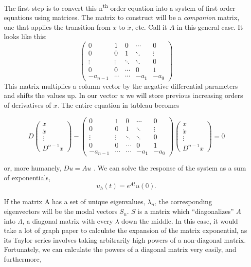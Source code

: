 \documentclass[a4paper,10pt]{report}
\numberwithin{equation}{section}
\begin{document}
The first step is to convert this n\textsuperscript{th}-order equation into a system of first-order equations using matrices. The matrix to construct will be a \emph{companion} matrix, one that applies the transition from $x$ to $\dot{x}$, etc. Call it $A$ in this general case. It looks like this:
\begin{equation}\label{companion}
\begin{pmatrix}
0 &1 &0 &\cdots &0\\
0 &0 &1 &\ddots &\vdots\\
\vdots &\vdots &\ddots &\ddots &0\\
0 &0 &\cdots &0 &1\\
-a_{n-1} &\cdots &\cdots &-a_1 &-a_0
\end{pmatrix}
\end{equation}
This matrix multiplies a column vector by the negative differential parameters and shifts the values up. In our vector $u$ we will store previous increasing orders of derivatives of $x$. The entire equation in tableau becomes\cite[p.~17]{Reid1992}

\begin{equation}
 D \begin{pmatrix}
      x\\
      \dot{x}\\
      \vdots\\
      D^{n-1}x
     \end{pmatrix}
-
\begin{pmatrix}
0 &1 &0 &\cdots &0\\
0 &0 &1 &\ddots &\vdots\\
\vdots &\vdots &\ddots &\ddots &0\\
0 &0 &\cdots &0 &1\\
-a_{n-1} &\cdots &\cdots &-a_1 &-a_0
\end{pmatrix}
\begin{pmatrix}
      x\\
      \dot{x}\\
      \vdots\\
      D^{n-1}x
     \end{pmatrix}
= 0
\end{equation}


or, more humanely, $Du = Au$ . We can solve the response of the system as a sum of exponentials,
\begin{equation}\label{homogeneous_exp}
u_h(t) = e^{At}u(0) \text{.}
\end{equation}

If the matrix A has a set of unique eigenvalues, $\lambda_n$, the corresponding eigenvectors will be the modal vectors $S_n$. $S$ is a matrix which ``diagonalizes'' $A$ into $\Lambda$, a diagonal matrix with every $\lambda$ down the middle. In this case, it would take a lot of graph paper to calculate the expansion of the matrix exponential, as its Taylor series involves taking arbitrarily high powers of a non-diagonal matrix. Fortunately, we can calculate the powers of a diagonal matrix very easily, and furthermore,\cite[p.~20]{Reid1992}
\end{document}

